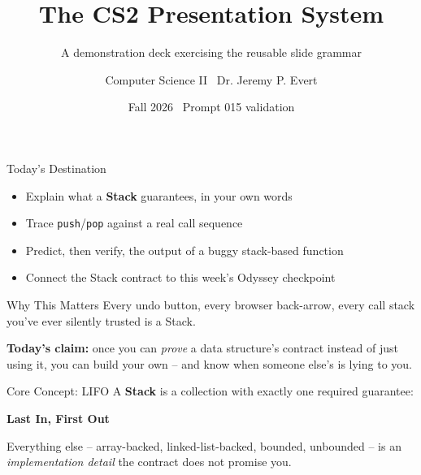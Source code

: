 \documentclass[aspectratio=169]{beamer}
\title{The CS2 Presentation System}
\subtitle{A demonstration deck exercising the reusable slide grammar}
\author{Computer Science II \textbullet\ Dr. Jeremy P. Evert}
\date{Fall 2026 \textbullet\ Prompt 015 validation}
\begin{document}
\begin{frame}[plain]
  \titlepage
\end{frame}

\begin{destinationframe}{Today's Destination}
  \begin{itemize}
    \item Explain what a \textbf{Stack} guarantees, in your own words
    \item Trace \texttt{push}/\texttt{pop} against a real call sequence
    \item Predict, then verify, the output of a buggy stack-based function
    \item Connect the Stack contract to this week's Odyssey checkpoint
  \end{itemize}
\end{destinationframe}

\begin{whymattersframe}{Why This Matters}
  Every undo button, every browser back-arrow, every call stack you've
  ever silently trusted is a Stack.

  \vspace{3mm}
  \textbf{Today's claim:} once you can \emph{prove} a data structure's
  contract instead of just using it, you can build your own -- and know
  when someone else's is lying to you.
\end{whymattersframe}

\begin{conceptframe}{Core Concept: LIFO}
  A \textbf{Stack} is a collection with exactly one required guarantee:

  \begin{center}
    \Large\color{cs2primary}\textbf{Last In, First Out}
  \end{center}

  \vspace{2mm}
  Everything else -- array-backed, linked-list-backed, bounded,
  unbounded -- is an \emph{implementation detail} the contract does not
  promise you.
\end{conceptframe}
\end{document}
